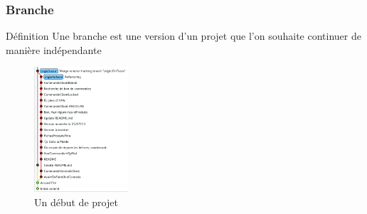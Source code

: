 	\begin{frame}
		\frametitle{Branche}
		\begin{block}{Définition}
			Une branche est une version d'un projet que l'on souhaite continuer de manière indépendante 
		\end{block}
		\begin{figure}
			\centering
			\includegraphics[width=35mm]{./Img/DefBranches.png}
			\caption{Un début de projet}
		\end{figure}
	\end{frame}
	
